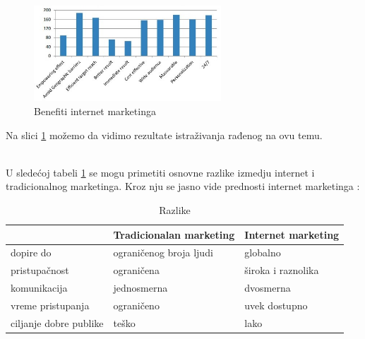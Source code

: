 \documentclass[a4paper]{article}
\begin{document}
{\medskip
\begin{figure}[h!]
\begin{center}
\includegraphics[width=7cm]{slika.benefiti.marketinga.jpg}
\end{center}
\caption{Benefiti internet marketinga}
\label{fig:benefiti}
\end{figure}
{Na slici \ref{fig:benefiti} možemo da vidimo rezultate istraživanja rađenog na ovu temu. }

\\U sledećoj tabeli \ref{tab:tabela1}  se mogu primetiti osnovne razlike izmedju internet i tradicionalnog marketinga. Kroz nju se jasno vide prednosti internet marketinga :
\newpage
\begin{table}[h!]
\begin{center}
\caption{Razlike}
\begin{tabular}{|p{2cm}|p{3.1cm}|p{3.1cm}|} \hline
     &\centering Tradicionalan marketing& Internet marketing\\ \hline
 \centering dopire do& ograničenog broja \centering ljudi & globalno\\   \hline
\centering pristupačnost & ograničena& široka i raznolika\\ \hline
\centering komunikacija & jednosmerna& dvosmerna\\\hline
 \centering vreme pristupanja& ograničeno& uvek dostupno \\ \hline
\centering ciljanje dobre  publike &  teško &  lako  \\ \hline
\end{tabular}
\label{tab:tabela1}
\end{center}
\end{table}



}
\end{document}
